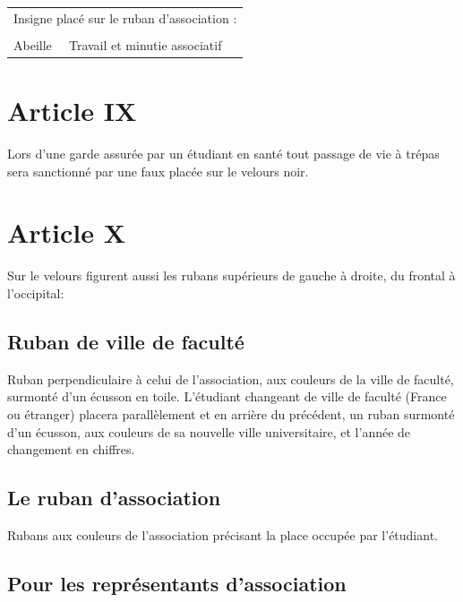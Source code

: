 \begin{center}
\begin{tabularx}{\textwidth}{X X}

\\
\multicolumn{2}{l}{Insigne placé sur le ruban d'association :}\\
\\
Abeille                       &Travail et minutie associatif\\
\end{tabularx}
\end{center}


\section{Article IX}
        Lors d'une garde assurée par un étudiant en santé tout passage de vie à trépas sera
sanctionné par une faux placée sur le velours noir.

\section{Article X}
 Sur le velours figurent aussi les rubans supérieurs de gauche à droite, du frontal à l'occipital:

\subsection{Ruban de ville de faculté}
          Ruban perpendiculaire à celui de l'association, aux couleurs de la ville de faculté,
surmonté d'un écusson en toile.
          L'étudiant changeant de ville de faculté (France ou étranger) placera parallèlement
et en arrière du précédent, un ruban surmonté d'un écusson, aux couleurs de sa nouvelle
ville universitaire, et l'année de changement en chiffres.

\subsection{Le ruban d'association}
Rubans aux couleurs de l'association précisant la place occupée par l'étudiant.


\subsection{Pour les représentants d'association}


